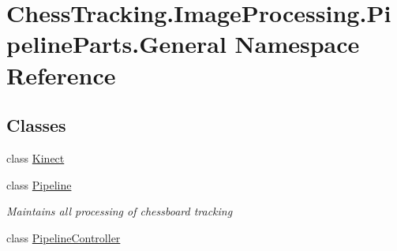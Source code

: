 \hypertarget{namespace_chess_tracking_1_1_image_processing_1_1_pipeline_parts_1_1_general}{}\section{Chess\+Tracking.\+Image\+Processing.\+Pipeline\+Parts.\+General Namespace Reference}
\label{namespace_chess_tracking_1_1_image_processing_1_1_pipeline_parts_1_1_general}
\subsection*{Classes}
\begin{DoxyCompactItemize}
\item 
class \mbox{\hyperlink{class_chess_tracking_1_1_image_processing_1_1_pipeline_parts_1_1_general_1_1_kinect}{Kinect}}
\item 
class \mbox{\hyperlink{class_chess_tracking_1_1_image_processing_1_1_pipeline_parts_1_1_general_1_1_pipeline}{Pipeline}}
\begin{DoxyCompactList}\small\item\em Maintains all processing of chessboard tracking \end{DoxyCompactList}\item 
class \mbox{\hyperlink{class_chess_tracking_1_1_image_processing_1_1_pipeline_parts_1_1_general_1_1_pipeline_controller}{Pipeline\+Controller}}
\end{DoxyCompactItemize}
